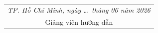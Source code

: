 \thispagestyle{empty}

\noindent\makebox[\linewidth]{\dotfill} \\
\noindent\makebox[\linewidth]{\dotfill} \\
\noindent\makebox[\linewidth]{\dotfill} \\
\noindent\makebox[\linewidth]{\dotfill} \\
\noindent\makebox[\linewidth]{\dotfill} \\
\noindent\makebox[\linewidth]{\dotfill} \\
\noindent\makebox[\linewidth]{\dotfill} \\
\noindent\makebox[\linewidth]{\dotfill} \\
\noindent\makebox[\linewidth]{\dotfill} \\
\noindent\makebox[\linewidth]{\dotfill} \\
\noindent\makebox[\linewidth]{\dotfill} \\
\noindent\makebox[\linewidth]{\dotfill} \\
\noindent\makebox[\linewidth]{\dotfill} \\
\noindent\makebox[\linewidth]{\dotfill} \\
\noindent\makebox[\linewidth]{\dotfill}

\vspace{1.5cm}

\begin{flushright}
  \begin{tabular}{c}
    \it TP. Hồ Chí Minh, ngày \dots\ tháng 06 năm 2026 \\[0.3cm]
    Giảng viên hướng dẫn
  \end{tabular}
\end{flushright}
